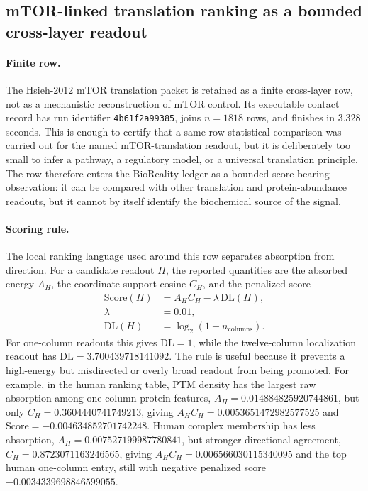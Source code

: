 
\subsection{mTOR-linked translation ranking as a bounded cross-layer readout}
\label{sec:bioreality-mtor-translation-topscore-hsieh2012}

\paragraph{Finite row.}
The Hsieh-2012 mTOR translation packet is retained as a finite cross-layer row, not as a mechanistic reconstruction of mTOR control.  Its executable contact record has run identifier \texttt{4b61f2a99385}, joins $n=1818$ rows, and finishes in $3.328$ seconds.  This is enough to certify that a same-row statistical comparison was carried out for the named mTOR-translation readout, but it is deliberately too small to infer a pathway, a regulatory model, or a universal translation principle.  The row therefore enters the BioReality ledger as a bounded score-bearing observation: it can be compared with other translation and protein-abundance readouts, but it cannot by itself identify the biochemical source of the signal.

\paragraph{Scoring rule.}
The local ranking language used around this row separates absorption from direction.  For a candidate readout $H$, the reported quantities are the absorbed energy $A_H$, the coordinate-support cosine $C_H$, and the penalized score
$$
\begin{aligned}
\mathrm{Score}(H) &= A_H C_H - \lambda\,\mathrm{DL}(H),\\
\lambda &= 0.01,\\
\mathrm{DL}(H) &= \log_2(1+n_{\mathrm{columns}}).
\end{aligned}
$$
For one-column readouts this gives $\mathrm{DL}=1$, while the twelve-column localization readout has $\mathrm{DL}=3.700439718141092$.  The rule is useful because it prevents a high-energy but misdirected or overly broad readout from being promoted.  For example, in the human ranking table, PTM density has the largest raw absorption among one-column protein features, $A_H=0.014884825920744861$, but only $C_H=0.3604440741749213$, giving $A_HC_H=0.0053651472982577525$ and $\mathrm{Score}=-0.004634852701742248$.  Human complex membership has less absorption, $A_H=0.007527199987780841$, but stronger directional agreement, $C_H=0.8723071163246565$, giving $A_HC_H=0.006566030115340095$ and the top human one-column entry, still with negative penalized score $-0.0034339698846599055$.

